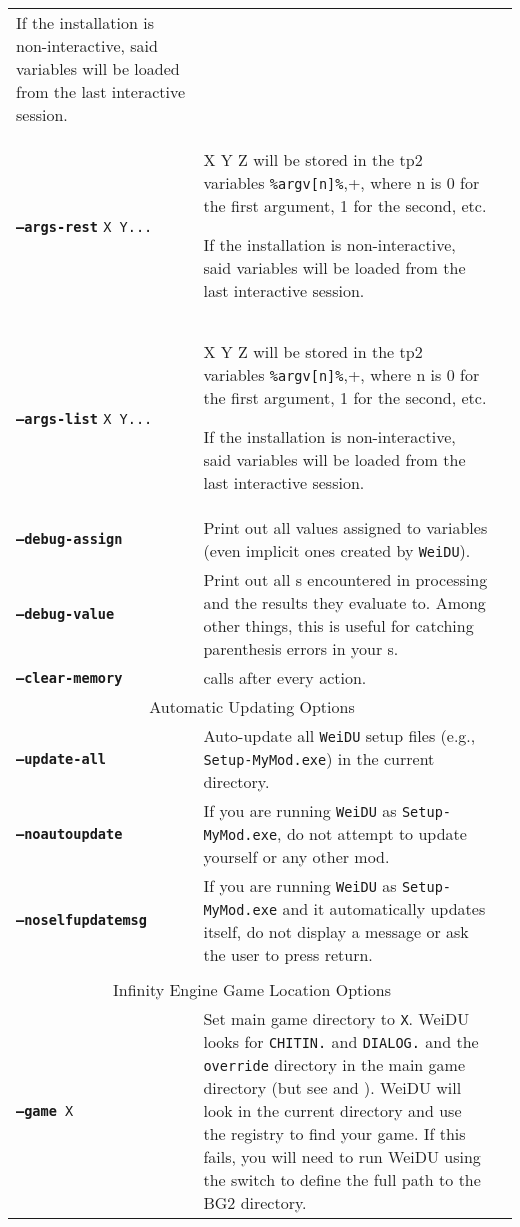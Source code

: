 \documentclass{article}
\def\ttref#1{\ahrefloc{#1}{\tt #1}}
\def\DEFINE#1{{\tt \bf #1}\label{#1}\index{#1}}
\def\t#1{{\tt #1}}
\begin{document}
\begin{tabular}{lp{10in}|p{10in}}
If the installation is non-interactive, said variables will be loaded from the last interactive
session. \\
\DEFINE{--args-rest} \t{X Y...} & X Y Z will be stored in the tp2 variables \verb+%argv[n]%+,
where n is 0 for the first argument, 1 for the second, etc.

If the installation is non-interactive, said variables will be loaded from the last interactive
session. \\
\DEFINE{--args-list} \t{X Y...} & X Y Z will be stored in the tp2 variables \verb+%argv[n]%+,
where n is 0 for the first argument, 1 for the second, etc.

If the installation is non-interactive, said variables will be loaded from the last interactive
session. \\
\DEFINE{--debug-assign} & Print out all values assigned to \ttref{TP2}
variables (even implicit ones created by \t{WeiDU}). \\
\DEFINE{--debug-value} & Print out all \ttref{value}s encountered in
\ttref{TP2} processing and the results they evaluate to. Among other
things, this is useful for catching parenthesis errors in your
\ttref{value}s. \\
\DEFINE{--clear-memory} & calls \ttref{CLEAR!MEMORY} after every \ttref{TP2} action.
\\
\multicolumn{2}{c}{ \color{red} Automatic Updating Options } \\
\DEFINE{--update-all} & Auto-update all \t{WeiDU} setup files (e.g.,
\t{Setup-MyMod.exe}) in the current directory. \\ 
\DEFINE{--noautoupdate} & If you are running \t{WeiDU} as
\t{Setup-MyMod.exe}, do not attempt to update yourself or any other mod. \\
\DEFINE{--noselfupdatemsg} & If you are running \t{WeiDU} as
\t{Setup-MyMod.exe} and it automatically updates itself, do not display a
message or ask the user to press return. \\
\\
\multicolumn{2}{c}{ \color{red} Infinity Engine Game Location Options } \\
{\tt \DEFINE{--game} X	} & Set main game directory to {\tt X}. WeiDU looks for
{\tt CHITIN.}\ttref{KEY} and {\tt DIALOG.}\ttref{TLK} and the \t{override}
directory in the main game directory (but see \ttref{--tlkin} and
\ttref{--search}). WeiDU will look in the current directory and use the
registry to find your game. If this fails, you will need to run WeiDU using
the \ttref{--game} switch to define the full path to the BG2 directory.

\end{tabular}
\end{document}
